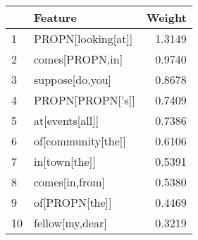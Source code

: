 \begin{tabular}{llr}
\toprule
{} &             Feature &  Weight \\
\midrule
1  &  PROPN[looking[at]] &  1.3149 \\
2  &     comes[PROPN,in] &  0.9740 \\
3  &     suppose[do,you] &  0.8678 \\
4  &    PROPN[PROPN['s]] &  0.7409 \\
5  &     at[events[all]] &  0.7386 \\
6  &  of[community[the]] &  0.6106 \\
7  &       in[town[the]] &  0.5391 \\
8  &      comes[in,from] &  0.5380 \\
9  &      of[PROPN[the]] &  0.4469 \\
10 &     fellow[my,dear] &  0.3219 \\
\bottomrule
\end{tabular}
